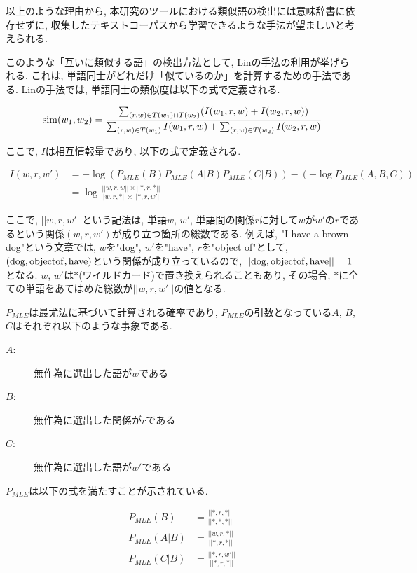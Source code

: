 \documentclass[12pt]{jarticle}
\begin{document}
以上のような理由から, 本研究のツールにおける類似語の検出には意味辞書に依存せずに, 収集したテキストコーパスから学習できるような手法が望ましいと考えられる.

このような「互いに類似する語」の検出方法として, Linの手法\cite{DekangLin}の利用が挙げられる. これは, 単語同士がどれだけ「似ているのか」を計算するための手法である. Linの手法では, 単語同士の類似度は以下の式で定義される.

\begin{equation}
  {\rm sim}(w_1, w_2) = \frac{\sum_{(r,w)\in T(w_1)\cap T(w_2)} (I(w_1, r, w) + I(w_2, r, w))}{\sum_{(r,w) \in T(w_1)}I(w_1, r, w) + \sum_{(r,w) \in T(w_2)}I(w_2, r, w)}
\end{equation}

ここで, $I$は相互情報量であり, 以下の式で定義される.

\begin{align}
I(w, r, w') & = -\log(P_{MLE}(B)P_{MLE}(A|B)P_{MLE}(C|B))-(-\log P_{MLE}(A,B,C)) \\
 & = \log \frac{||w,r,w||\times||*,r,*||}{||w,r,*||\times||*,r,w'||}
\end{align}

ここで, $||w, r, w'||$という記法は, 単語$w$, $w'$, 単語間の関係$r$に対して$w$が$w'$の$r$であるという関係$(w, r, w')$が成り立つ箇所の総数である. 例えば, "I have a brown dog"という文章では, $w$を"dog", $w'$を"have", $r$を"object of"として, $\rm (dog, objectof, have)$という関係が成り立っているので, $\rm||dog, object of, have||=1$となる.
$w$, $w'$は$*$(ワイルドカード)で置き換えられることもあり, その場合, $*$に全ての単語をあてはめた総数が$||w, r, w'||$の値となる.

$P_{MLE}$は最尤法に基づいて計算される確率であり, $P_{MLE}$の引数となっている$A$, $B$, $C$はそれぞれ以下のような事象である.

\begin{description}
  \item[$A$:]無作為に選出した語が$w$である
  \item[$B$:]無作為に選出した関係が$r$である
  \item[$C$:]無作為に選出した語が$w'$である
\end{description}

$P_{MLE}$は以下の式を満たすことが示されている.

\begin{align}
  P_{MLE}(B)   & = \frac{||*, r, *||}{||*, *, *||}\\
  P_{MLE}(A|B) & = \frac{||w, r, *||}{||*, r, *||}\\
  P_{MLE}(C|B) & = \frac{||*, r,w'||}{||*, r, *||}
\end{align}
\end{document}
